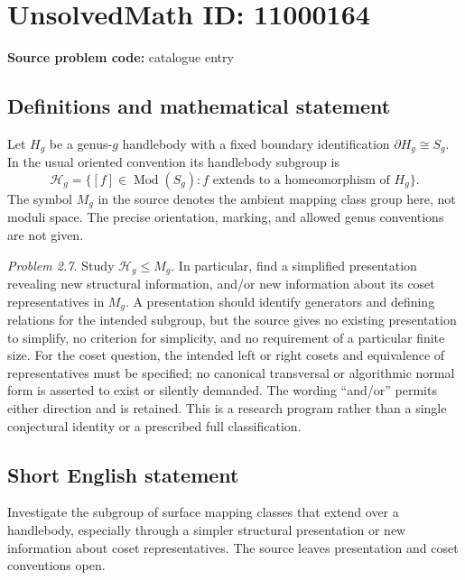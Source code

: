 \documentclass[11pt]{article}
\begin{document}
\section*{UnsolvedMath ID: 11000164}
\textbf{Source problem code:} catalogue entry
\subsection{Definitions and mathematical statement}
Let \(H_g\) be a genus-\(g\) handlebody with a fixed boundary identification \(\partial H_g\cong S_g\). In the usual oriented convention its handlebody subgroup is
\[
 \mathcal H_g=\{[f]\in\operatorname{Mod}(S_g):
 f\text{ extends to a homeomorphism of }H_g\}.
\]
The symbol \(M_g\) in the source denotes the ambient mapping class group here, not moduli space. The precise orientation, marking, and allowed genus conventions are not given.

\emph{Problem 2.7.} Study \(\mathcal H_g\leq M_g\). In particular, find a simplified presentation revealing new structural information, and/or new information about its coset representatives in \(M_g\). A presentation should identify generators and defining relations for the intended subgroup, but the source gives no existing presentation to simplify, no criterion for simplicity, and no requirement of a particular finite size. For the coset question, the intended left or right cosets and equivalence of representatives must be specified; no canonical transversal or algorithmic normal form is asserted to exist or silently demanded. The wording ``and/or'' permits either direction and is retained. This is a research program rather than a single conjectural identity or a prescribed full classification.
\subsection{Short English statement}
Investigate the subgroup of surface mapping classes that extend over a handlebody, especially through a simpler structural presentation or new information about coset representatives. The source leaves presentation and coset conventions open.
\end{document}
